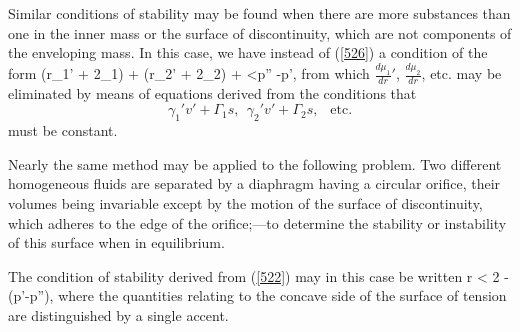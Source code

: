 \documentclass[12pt]{article}
\begin{document}
{Similar conditions of stability may be found when there are more substances than one in the inner mass or the surface of discontinuity, which are not components of the enveloping mass. In this case, we have instead of (\ref{526}) a condition of the form
\eqs (r\gamma_1' + 2\Gamma_1)  + (r\gamma_2' + 2\Gamma_2)  +  <p'' -p',  \label{532} \eqe
from which $\frac{d\mu_1}{dr}'$, $\frac{d\mu_2}{dr}$, etc. may be eliminated by means of equations
derived from the conditions that
$$ \gamma_1' v' + \Gamma_1 s, \ \ \gamma_2' v' + \Gamma_2 s, \ \ \text{ etc.} $$ 
must be constant.

Nearly the same method may be applied to the following problem. Two different homogeneous fluids are separated by a diaphragm having a circular orifice, their volumes being invariable except by the motion of the surface of discontinuity, which adheres to the edge of the orifice;---to determine the stability or instability of this surface when in equilibrium.

The condition of stability derived from (\ref{522}) may in this case be
written
\eqs r < 2 - (p'-p''), \label{535} \eqe
where the quantities relating to the concave side of the surface of tension are distinguished by a single accent.

}
\end{document}
